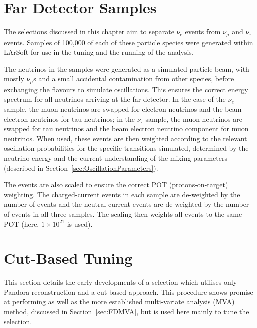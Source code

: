 \section{Far Detector Samples}\label{sec:FDSamples}

The selections discussed in this chapter aim to separate $\nu_e$ events from $\nu_{\mu}$ and $\nu_{\tau}$ events.  Samples of 100,000 of each of these particle species were generated within LArSoft for use in the tuning and the running of the analysis.

The neutrinos in the samples were generated as a simulated particle beam, with mostly $\nu_{\mu}$s and a small accidental contamination from other species, before exchanging the flavours to simulate oscillations.  This ensures the correct energy spectrum for all neutrinos arriving at the far detector.  In the case of the $\nu_e$ sample, the muon neutrinos are swapped for electron neutrinos and the beam electron neutrinos for tau neutrinos; in the $\nu_{\tau}$ sample, the muon neutrinos are swapped for tau neutrinos and the beam electron neutrino component for muon neutrinos.  When used, these events are then weighted according to the relevant oscillation probabilities for the specific transitions simulated, determined by the neutrino energy and the current understanding of the mixing parameters (described in Section~\ref{sec:OscillationParameters}).

The events are also scaled to ensure the correct POT (protons-on-target) weighting.  The charged-current events in each sample are de-weighted by the number of events and the neutral-current events are de-weighted by the number of events in all three samples.  The scaling then weights all events to the same POT (here, $1\times10^{21}$ is used).

\section{Cut-Based Tuning}\label{sec:FDCut}

This section details the early developments of a selection which utilises only Pandora reconstruction and a cut-based approach.  This procedure shows promise at performing as well as the more established multi-variate analysis (MVA) method, discussed in Section~\ref{sec:FDMVA}, but is used here mainly to tune the selection.

